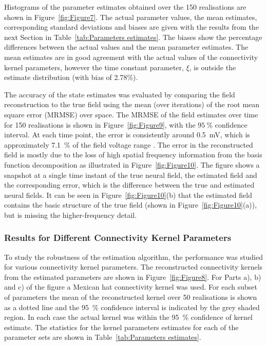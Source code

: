 \documentclass[12pt]{iopart}
\begin{document}
Histograms of the parameter estimates obtained over the 150 realisations are shown in Figure~\ref{fig:Figure7}. The actual parameter values, the mean estimates, corresponding standard deviations and biases are given with the results from the next Section in Table~\ref{tab:Parameters estimates}. The biases show the percentage differences between the actual values and the mean parameter estimates. The mean estimates are in good agreement with the actual values of the connectivity kernel parameters, however the time constant parameter, $\xi$, is outside the estimate distribution (with bias of 2.78\%).

The accuracy of the state estimates was evaluated by comparing the field reconstruction to the true field using the mean (over iterations) of the root mean square error (MRMSE) over space. The MRMSE of the field estimates over time for 150 realisations is shown in Figure~\ref{fig:Figure9}, with the $95~\%$ confidence interval. At each time point, the error is consistently around 0.5~mV, which is approximately 7.1~\% of the field voltage range . The error in the reconstructed field is mostly due to the loss of high spatial frequency information from the basis function decomposition as illustrated in Figure~\ref{fig:Figure10}. The figure shows a snapshot at a single time instant of the true neural field, the estimated field and the corresponding error, which is the difference between the true and estimated neural fields. It can be seen in Figure~\ref{fig:Figure10}(b) that the estimated field contains the basic structure of the true field (shown in Figure~\ref{fig:Figure10}(a)), but is missing the higher-frequency detail.

\subsubsection{Results for Different Connectivity Kernel Parameters}

To study the robustness of the estimation algorithm, the performance was studied for various connectivity kernel parameters. The reconstructed connectivity kernels from the estimated parameters are shown in Figure~\ref{fig:Figure8}. For Parts a), b) and c) of the figure a Mexican hat connectivity kernel was used. For each subset of parameters the mean of the reconstructed kernel over 50 realisations is shown as a dotted line and the 95~\% confidence interval is indicated by the grey shaded region. In each case the actual kernel was within the 95~\% confidence of kernel estimate. The statistics for the kernel parameters estimates for each of the parameter sets are shown in Table~\ref{tab:Parameters estimates}.
\end{document}
